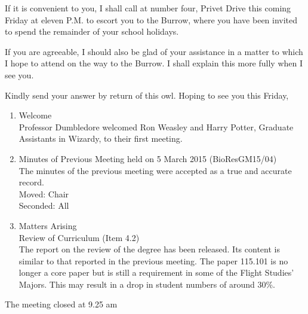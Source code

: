 \documentclass[11pt]{IFSCommunication}
\begin{document}
\clearpage


\memoTo{} %
\memoFrom{} %
\memoCC{} %
\memoSubject{} %



If it is convenient to you, I shall call at number four, Privet Drive this coming Friday at eleven P.M. to escort you to the Burrow, where you have been invited to spend the remainder of your school holidays.

If you are agreeable, I should also be glad of your assistance in a matter to which I hope to attend on the way to the Burrow. I shall explain this more fully when I see you.

Kindly send your answer by return of this owl. Hoping to see you this Friday,

\clearpage


{}  %
{}  %
{} %
{} %
{} %
{} %
{} 

\meeting

\begin{enumerate}

\item Welcome\\
	Professor Dumbledore welcomed Ron Weasley and Harry Potter, Graduate Assistants in Wizardy, to their first meeting.

\item Minutes of Previous Meeting held on 5 March 2015	(BioResGM15/04)\\

	The minutes of the previous meeting were accepted as a true and accurate record.\\
	\hfill Moved: Chair\\
	\hfill Seconded:  All
\item Matters Arising \\
	Review of Curriculum (Item 4.2)\\
	The report on the review of the degree has been released.  Its content is similar to that reported in the previous meeting.  The paper 115.101 is no longer a core paper but is still a requirement in some of the Flight Studies’ Majors.  This may result in a drop in student numbers of around 30\%.  

\end{enumerate}

\hfill{The meeting closed at 9.25 am}\hfill\null
\end{document}
